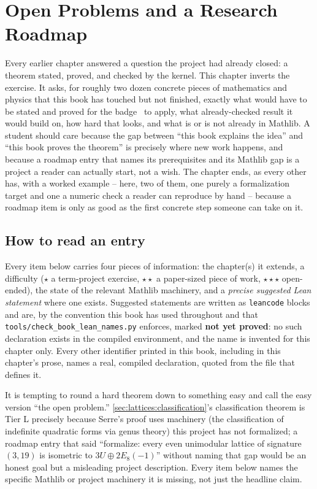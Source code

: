 \chapter{Open Problems and a Research Roadmap}\label{ch:open}

Every earlier chapter answered a question the project had already closed: a theorem stated,
proved, and checked by the kernel. This chapter inverts the exercise. It asks, for roughly
two dozen concrete pieces of mathematics and physics that this book has touched but not
finished, exactly what would have to be stated and proved for the badge \TA\ to apply, what
already-checked result it would build on, how hard that looks, and what is or is not
already in Mathlib. A student should care because the gap between ``this book explains the
idea'' and ``this book proves the theorem'' is precisely where new work happens, and because
a roadmap entry that names its prerequisites and its Mathlib gap is a project a reader can
actually start, not a wish. The chapter ends, as every other has, with a worked example --
here, two of them, one purely a formalization target and one a numeric check a reader can
reproduce by hand -- because a roadmap item is only as good as the first concrete step
someone can take on it.

\section{How to read an entry}\label{sec:open:how}

Every item below carries four pieces of information: the chapter(s) it extends, a
difficulty ($\star$ a term-project exercise, $\star\star$ a paper-sized piece of work,
$\star\star\star$ open-ended), the state of the relevant Mathlib machinery, and a
\emph{precise suggested Lean statement} where one exists. Suggested statements are written
as \texttt{leancode} blocks and are, by the convention this book has used throughout and that
\texttt{tools/check\_book\_lean\_names.py} enforces, marked \textbf{not yet proved}: no such
declaration exists in the compiled environment, and the name is invented for this chapter
only. Every other identifier printed in this book, including in this chapter's prose, names
a real, compiled declaration, quoted from the file that defines it.

\begin{pitfallbox}
It is tempting to round a hard theorem down to something easy and call the easy version
``the open problem.'' \cref{sec:lattices:classification}'s classification theorem is Tier
L precisely because Serre's proof uses machinery (the classification of indefinite
quadratic forms via genus theory) this project has not formalized; a roadmap entry that
said ``formalize: every even unimodular lattice of signature $(3,19)$ is isometric to
$3U\oplus2E_8(-1)$'' without naming that gap would be an honest goal but a misleading
project description. Every item below names the specific Mathlib or project machinery it
is missing, not just the headline claim.
\end{pitfallbox}

